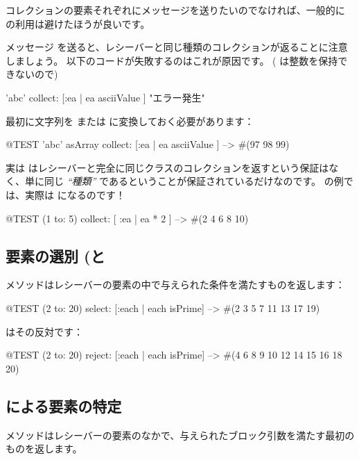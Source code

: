 \documentclass[a4paper,10pt,twoside]{book}
\begin{document}
コレクションの要素それぞれにメッセージを送りたいのでなければ、一般的に  の利用は避けたほうが良いです。

メッセージ  を送ると、レシーバーと同じ種類のコレクションが返ることに注意しましょう。
以下のコードが失敗するのはこれが原因です。
( は整数を保持できないので)
\begin{code}{}
'abc' collect: [:ea | ea asciiValue ]      "エラー発生"
\end{code}
\noindent
最初に文字列を  または  に変換しておく必要があります：
\begin{code}{@TEST}
'abc' asArray collect: [:ea | ea asciiValue ] --> #(97 98 99)
\end{code}

実は  はレシーバーと完全に同じクラスのコレクションを返すという保証はなく、単に同じ \emph{``種類''} であるということが保証されているだけなのです。 の例では、実際は  になるのです！
\begin{code}{@TEST}
(1 to: 5) collect: [ :ea | ea * 2 ] --> #(2 4 6 8 10)
\end{code}

\subsection{要素の選別 (と}

 メソッドはレシーバーの要素の中で与えられた条件を満たすものを返します：

\begin{code}{@TEST}
(2 to: 20) select: [:each | each isPrime] --> #(2 3 5 7 11 13 17 19)
\end{code}

 はその反対です：
\begin{code}{@TEST}
(2 to: 20) reject: [:each | each isPrime] --> #(4 6 8 9 10 12 14 15 16 18 20)
\end{code}

\subsection{ による要素の特定}
 メソッドはレシーバーの要素のなかで、与えられたブロック引数を満たす最初のものを返します。
\end{document}
